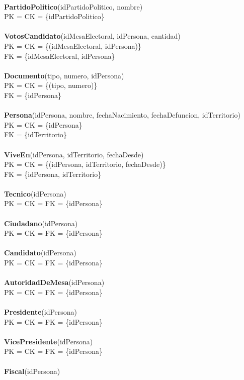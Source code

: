 \\
\textbf{PartidoPolitico}(idPartidoPolitico, nombre)\\
  PK = CK = \{idPartidoPolitico\}\\
\\
\textbf{VotosCandidato}(idMesaElectoral, idPersona, cantidad)\\
  PK = CK = \{(idMesaElectoral, idPersona)\}\\
  FK = \{idMesaElectoral, idPersona\}\\
\\
\textbf{Documento}(tipo, numero, idPersona)\\
  PK = CK = \{(tipo, numero)\}\\
  FK = \{idPersona\}\\
\\
\textbf{Persona}(idPersona, nombre, fechaNacimiento, fechaDefuncion, idTerritorio)\\
  PK = CK = \{idPersona\}\\
  FK = \{idTerritorio\}\\
\\
\textbf{ViveEn}(idPersona, idTerritorio, fechaDesde)\\
  PK = CK = \{(idPersona, idTerritorio, fechaDesde)\}\\
  FK = \{idPersona, idTerritorio\}\\
\\
\textbf{Tecnico}(idPersona)\\
  PK = CK = FK = \{idPersona\}\\
\\
\textbf{Ciudadano}(idPersona)\\
  PK = CK = FK = \{idPersona\}\\
\\
\textbf{Candidato}(idPersona)\\
  PK = CK = FK = \{idPersona\}\\
\\
\textbf{AutoridadDeMesa}(idPersona)\\
  PK = CK = FK = \{idPersona\}\\
\\
\textbf{Presidente}(idPersona)\\
  PK = CK = FK = \{idPersona\}\\
\\
\textbf{VicePresidente}(idPersona)\\
  PK = CK = FK = \{idPersona\}\\
\\
\textbf{Fiscal}(idPersona)\\
